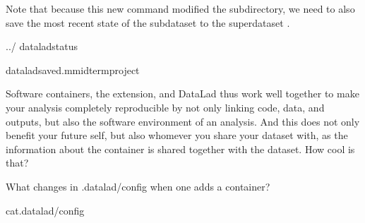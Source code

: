 \sphinxAtStartPar
Note that because this new  command modified the
 subdirectory, we need to also save
the most recent state of the subdataset to the superdataset .

\begin{sphinxVerbatim}[commandchars=\\\{\}]
../
dataladstatus
\end{sphinxVerbatim}

\begin{sphinxVerbatim}[commandchars=\\\{\}]
dataladsave\PYGZhy{}d.\PYGZhy{}mmidterm\PYGZus{}project
\end{sphinxVerbatim}

\sphinxAtStartPar
Software containers, the  extension, and DataLad thus work well together
to make your analysis completely reproducible \textendash{} by not only linking code, data,
and outputs, but also the software environment of an analysis. And this does not
only benefit your future self, but also whomever you share your dataset with, as
the information about the container is shared together with the dataset. How cool
is that?

\ignorespaces 
\sphinxAtStartPar
What changes in .datalad/config when one adds a container?

\begin{sphinxVerbatim}[commandchars=\\\{\}]
cat.datalad/config
\end{sphinxVerbatim}

